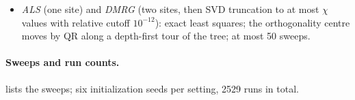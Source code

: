 \begin{itemize}
    Hessian block is damped by $10^{-3}$ times its mean eigenvalue (scale-free) or, at $\lr=0.1$, by
    an absolute floor $10^{-4}$ or $10^{-2}$; no divergence guard, because the first step overshoots the
    loss before it returns (medians up to $4\cdot10^{34}\Loss_0$ on binary4, single runs up to $5\cdot10^{36}\Loss_0$,
    deep trees $10^{52}\Loss_0$); $5\cdot10^4$ (binary4; $2\cdot10^5$ with a floor) and $10^5$ (deep) steps.
  \item \emph{ALS} (one site) and \emph{DMRG} (two sites, then SVD truncation to at most $\chi$
    values with relative cutoff $10^{-12}$): exact least squares; the orthogonality centre moves by QR
    along a depth-first tour of the tree; at most 50 sweeps.
\end{itemize}

\paragraph{Sweeps and run counts.}
 lists the sweeps; six initialization seeds per setting, 2529 runs in total.

